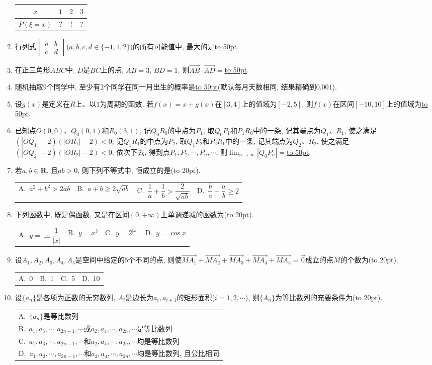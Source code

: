 \documentclass[10pt,a4paper]{article}
\newcommand{\blank}[1]{\underline{\hbox to #1pt{}}}
\newcommand{\bracket}[1]{(\hbox to #1pt{})}
\newcommand{\onech}[4]{\par\begin{tabular}{p{.9\textwidth}}
A.~#1\\
B.~#2\\
C.~#3\\
D.~#4
\end{tabular}}
\newcommand{\fourch}[4]{\par\begin{tabular}{p{.23\textwidth}p{.23\textwidth}p{.23\textwidth}p{.23\textwidth}}
A.~#1 &B.~#2& C.~#3& D.~#4
\end{tabular}}
\begin{document}
\begin{enumerate}[1.]
\begin{center}
\begin{tabular}{|c|c|c|c|}
\hline
$x$ & $1$ & $2$ & $3$ \\ \hline
$P(\xi=x)$ & ? & ! & ? \\ \hline
\end{tabular}
\end{center}
\item 行列式$\begin{vmatrix}
a & b  \\ c & d  \end{vmatrix}$($a,b,c,d\in \{-1,1,2\}$)的所有可能值中, 最大的是\blank{50}.
\item 在正三角形$ABC$中, $D$是$BC$上的点, $AB=3$, $BD=1$, 则$\overrightarrow{AB}\cdot \overrightarrow{AD}=$\blank{50}.
\item 随机抽取$9$个同学中, 至少有$2$个同学在同一月出生的概率是\blank{50}(默认每月天数相同, 结果精确到$0.001$).
\item 设$g(x)$是定义在$R$上、以$1$为周期的函数, 若$f(x)=x+g(x)$在$[3,4]$上的值域为$[-2,5]$, 则$f(x)$在区间$[-10,10]$上的值域为\blank{50}.
\item 已知点$O(0,0)$、$Q_0(0,1)$和$R_0(3,1)$, 记$Q_0R_0$的中点为$P_1$, 取$Q_0P_1$和$P_1R_0$中的一条, 记其端点为$Q_1$、$R_1$, 使之满足$(|OQ_1|-2)(|OR_1|-2)<0$; 记$Q_1R_1$的中点为$P_2$, 取$Q_1P_2$和$P_2R_1$中的一条, 记其端点为$Q_2$、$R_2$, 使之满足$(|OQ_2|-2)(|OR_2|-2)<0$; 依次下去, 得到点$P_1,P_2,\cdots ,P_n,\cdots$, 则$\displaystyle\lim_{n\to\infty}|Q_0P_n|=$\blank{50}.
\item 若$a,b\in \mathbf{R}$, 且$ab>0$, 则下列不等式中, 恒成立的是\bracket{20}.
\fourch{$a^2+b^2>2ab$}{$a+b\ge 2\sqrt {ab}$}{$\dfrac 1a+\dfrac 1b>\dfrac 2{\sqrt {ab}}$}{$\dfrac ba+\dfrac ab\ge 2$}
\item 下列函数中, 既是偶函数, 又是在区间$(0,+\infty)$上单调递减的函数为\bracket{20}.
\fourch{$y=\ln \dfrac 1{|x|}$}{$y=x^3$}{$y=2^{|x|}$}{$y=\cos x$}
\item 设$A_1,A_2,A_3,A_4,A_5$是空间中给定的$5$个不同的点, 则使$\overrightarrow{MA_1}+\overrightarrow{MA_2}+\overrightarrow{MA_3}+\overrightarrow{MA_4}+\overrightarrow{MA_5}=\overrightarrow 0$成立的点$M$的个数为\bracket{20}.
\fourch{$0$}{$1$}{$5$}{$10$}
\item 设$\{a_n\}$是各项为正数的无穷数列, $A_i$是边长为$a_i,a_{i+1}$的矩形面积($i=1,2,\cdots$), 则$\{A_n\}$为等比数列的充要条件为\bracket{20}.
\onech{$\{a_n\}$是等比数列}{$a_1,a_3,\cdots ,a_{2n-1},\cdots$或$a_2,a_4,\cdots ,a_{2n},\cdots$是等比数列}{$a_1,a_3,\cdots ,a_{2n-1},\cdots$和$a_2,a_4,\cdots ,a_{2n},\cdots$均是等比数列}{$a_1,a_3,\cdots ,a_{2n-1},\cdots$和$a_2,a_4,\cdots ,a_{2n},\cdots$均是等比数列, 且公比相同}

\end{enumerate}
\end{document}
